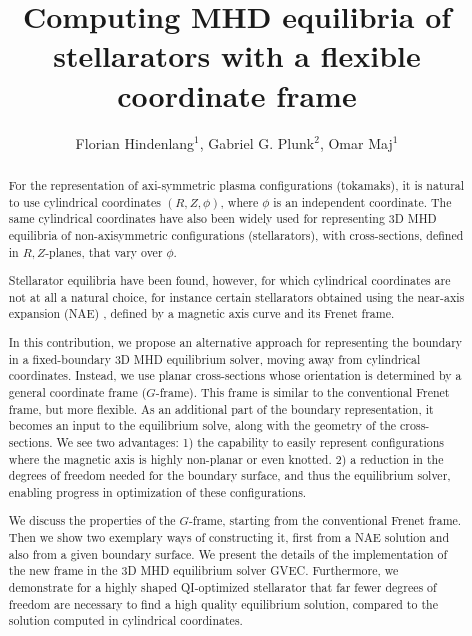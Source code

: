 \documentclass[12pt]{iopart}
\newcommand\hlchangedrev[1]{#1} %
\newcommand\GFF{$G$-frame}
\newcommand\RZplanes[1]{$R,Z$-planes{#1}}
\begin{document}
\title{\hlchangedrev{Computing MHD equilibria of stellarators with a flexible coordinate frame}}

\author{Florian Hindenlang$^{1}$, Gabriel G. Plunk$^{2}$, Omar Maj$^{1}$}
\address{ $^1$Numerical Methods in Plasma Physics, Max Planck Institute for Plasma Physics, Garching, Germany}
\address{$^2$Max Planck Institute for Plasma Physics, Greifswald, Germany}


\begin{abstract} 
For the representation of axi-symmetric plasma configurations (tokamaks), it is natural to use cylindrical coordinates $(R,Z,\phi)$, where $\phi$ is an independent coordinate. The same cylindrical coordinates have also been widely used for representing 3D MHD equilibria of non-axisymmetric configurations (stellarators), with cross-sections, defined in \RZplanes{}, that vary over $\phi$. 

Stellarator equilibria have been found, however, for which cylindrical coordinates are not at all a natural choice, for instance certain stellarators obtained using the near-axis expansion (NAE) \cite{landreman-sengupta-plunk,plunk_landreman_helander_2019}, defined by a magnetic axis curve and its Frenet frame.

\hlchangedrev{In this contribution, we propose an alternative approach for representing the boundary in a fixed-boundary 3D MHD equilibrium solver, moving away from cylindrical coordinates. 
Instead, we use planar cross-sections whose orientation is determined by a general coordinate frame (\GFF). This frame is similar to the conventional Frenet frame, but more flexible. 
As an additional part of the boundary representation, it becomes an input to the equilibrium solve, along with the geometry of the cross-sections.}
We see two advantages: 1) the capability to easily represent configurations where the magnetic axis is highly non-planar or even knotted. 2) a reduction in the degrees of freedom needed for the \hlchangedrev{boundary surface, and thus the equilibrium solver,} enabling progress in optimization of these configurations.

\hlchangedrev{We discuss the properties of the \GFF, starting from the conventional Frenet frame. Then we show two exemplary ways of constructing it, first from a NAE solution and also from a given boundary surface. We present the details of the implementation of the new frame in the 3D MHD equilibrium solver GVEC.} Furthermore, we demonstrate for a highly shaped QI-optimized stellarator that far fewer degrees of freedom are necessary to find a high quality equilibrium solution, compared to the solution computed in cylindrical coordinates.
\end{abstract}
\end{document}
